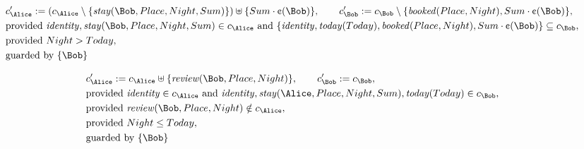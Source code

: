\begin{align*}
&
c'_
{
\Alice
}
 := 
(c_
{
\Alice
}
 \setminus 
\{
\mathit{
stay
}
(
\Bob
,
Place
,
Night
,
Sum
)
\}
) \uplus 
\{
Sum
\cdot
\text{\textcent}
(
\Bob
)
\}
, \qquad 
c'_
{
\Bob
}
 := 
c_
{
\Bob
}
 \setminus 
\{
\mathit{
booked
}
(
Place
,
Night
)
,
Sum
\cdot
\text{\textcent}
(
\Bob
)
\}
,\\
&
\text{provided } 
\mathit{
identity
}
,
\mathit{
stay
}
(
\Bob
,
Place
,
Night
,
Sum
)
 \in c_
{
\Alice
}
 \text{ and } 
\{
\mathit{
identity
}
,
\mathit{
today
}
(
Today
)
,
\mathit{
booked
}
(
Place
,
Night
)
,
Sum
\cdot
\text{\textcent}
(
\Bob
)
\}
 \subseteq c_
{
\Bob
}
,\\
&
\text{provided } 
Night
>
Today
,\\
&
\text{guarded by } \{
\Bob
\}
\end{align*}

\begin{align*}
&
c'_
{
\Alice
}
 := 
c_
{
\Alice
}
 \uplus 
\{
\mathit{
review
}
(
\Bob
,
Place
,
Night
)
\}
, \qquad 
c'_
{
\Bob
}
 := 
c_
{
\Bob
}
,\\
&
\text{provided } 
\mathit{
identity
}
 \in c_
{
\Alice
}
 \text{ and } 
\mathit{
identity
}
,
\mathit{
stay
}
(
\Alice
,
Place
,
Night
,
Sum
)
,
\mathit{
today
}
(
Today
)
 \in c_
{
\Bob
}
,\\
&
\text{provided } 
\mathit{
review
}
(
\Bob
,
Place
,
Night
)
 \notin c_
{
\Alice
}
,\\
&
\text{provided } 
Night
\le
Today
,\\
&
\text{guarded by } \{
\Bob
\}
\end{align*}
